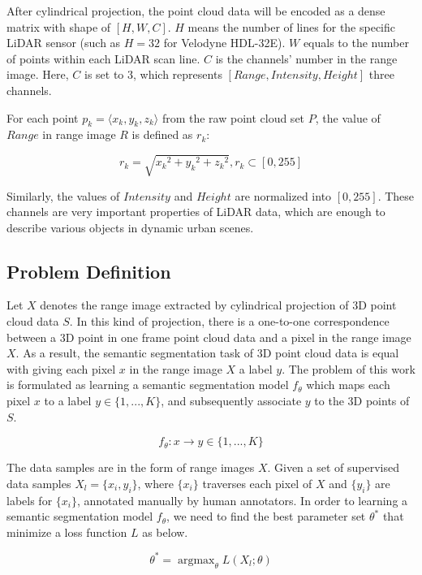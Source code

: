 After cylindrical projection, the point cloud data will be encoded as a dense matrix with shape of $[H,W,C]$. $H$ means the number of lines for the specific LiDAR sensor (such as $H=32$ for Velodyne HDL-32E). $W$ equals to the number of points within each LiDAR scan line. $C$ is the channels' number in the range image. Here, $C$ is set to 3, which represents $[Range,Intensity,Height]$ three channels.

For each point $p_k=\langle x_k,y_k,z_k\rangle$ from the raw point cloud set $P$, the value of $Range$ in range image $R$ is defined as $r_k$:
 
\begin{equation}
r_k=\sqrt{{x_k}^2+{y_k}^2+{z_k}^2},  r_k\subset [0,255]	
\end{equation} 

Similarly, the values of $Intensity$ and $Height$ are normalized into $[0,255]$. These channels are very important properties of LiDAR data, which are enough to describe various objects in dynamic urban scenes.
 
\subsection{Problem Definition}

Let $X$ denotes the range image extracted by cylindrical projection of 3D point cloud data $S$. In this kind of projection, there is a one-to-one correspondence between a 3D point in one frame point cloud data and a pixel in the range image $X$. As a result, the semantic segmentation task of 3D point cloud data is equal with giving each pixel $x$ in the range image $X$ a label $y$. The problem of this work is formulated as learning a semantic segmentation model $f_{\theta}$ which maps each pixel $x$ to a label $y\in\{1,...,K\}$, and subsequently associate $y$ to the 3D points of $S$.

\begin{equation}
f_{\theta}: x\to y \in \{1,...,K\}
\end{equation}

The data samples are in the form of range images $X$. Given a set of supervised data samples $X_l=\{x_i, y_i\}$, where $\{x_i\}$ traverses each pixel of $X$ and $\{y_i\}$ are labels for $\{x_i\}$, annotated manually by human annotators. 
In order to learning a semantic segmentation model $f_\theta$, we need to find the best parameter set $\theta^*$ that minimize a loss function $L$ as below.

\begin{equation}
\theta^{*}=\mathop{\arg\max}_{\theta}L(X_l; \theta)
\end{equation}

